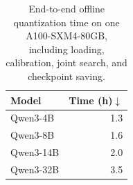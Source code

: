 \begin{table}[t]
\centering
\caption{
End-to-end offline quantization time on one A100-SXM4-80GB, including loading, calibration, joint search, and checkpoint saving.
}
\label{tab:search-time}
\begin{tabular}{lr}
\toprule
Model & Time (h)$\downarrow$ \\
\midrule
Qwen3-4B & 1.3 \\
Qwen3-8B & 1.6 \\
Qwen3-14B & 2.0 \\
Qwen3-32B & 3.5 \\
\bottomrule
\end{tabular}
\end{table}

